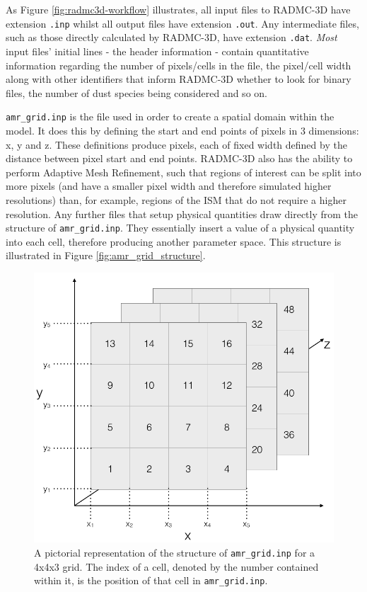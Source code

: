 \documentclass{report}
\begin{document}
As Figure \ref{fig:radmc3d-workflow} illustrates, all input files to RADMC-3D have extension \texttt{.inp} whilst all output files have extension \texttt{.out}. Any intermediate files, such as those directly calculated by RADMC-3D, have extension \texttt{.dat}. \textit{Most} input files' initial lines - the header information - contain quantitative information regarding the number of pixels/cells in the file, the pixel/cell width along with other identifiers that inform RADMC-3D whether to look for binary files, the number of dust species being considered and so on.

\texttt{amr\_grid.inp} is the file used in order to create a spatial domain within the model. It does this by defining the start and end points of pixels in 3 dimensions: x, y and z. These definitions produce pixels, each of fixed width defined by the distance between pixel start and end points. RADMC-3D also has the ability to perform Adaptive Mesh Refinement, such that regions of interest can be split into more pixels (and have a smaller pixel width and therefore simulated higher resolutions) than, for example, regions of the ISM that do not require a higher resolution. Any further files that setup physical quantities draw directly from the structure of \texttt{amr\_grid.inp}. They essentially \textquotesingle insert \textquotesingle a value of a physical quantity into each cell, therefore producing another parameter space. This structure is illustrated in Figure \ref{fig:amr_grid_structure}.

\begin{figure}
  \centering
  \includegraphics[scale=0.3]{../img/amr_grid_structure}
  \caption[A pictorial representation of the structure of \texttt{amr\_grid.inp} for a 4x4x3 grid. The index of a cell, denoted by the number contained within it, is the position of that cell in \texttt{amr\_grid.inp}.]{A pictorial representation of the structure of \texttt{amr\_grid.inp} for a 4x4x3 grid. The index of a cell, denoted by the number contained within it, is the position of that cell in \texttt{amr\_grid.inp}.}
\end{figure}\label{fig:amr_grid_structure}
\end{document}
